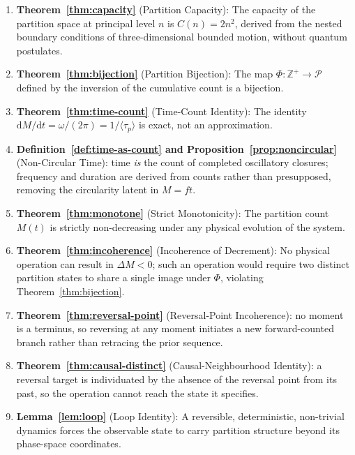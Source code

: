 \documentclass[twocolumn,10pt,a4paper]{article}
\theoremstyle{thmstyle}
\theoremstyle{definition}
\theoremstyle{remark}
\newcommand{\Zp}{\mathbb{Z}^{+}}
\newcommand{\Parts}{\mathcal{P}}
\newcommand{\tp}{\langle\tau_{p}\rangle}
\newcommand{\dM}{\mathrm{d}M}
\newcommand{\dt}{\mathrm{d}t}
\newcommand{\PhiMap}{\varPhi}
\begin{document}
\begin{enumerate}[leftmargin=1.5em,itemsep=0.2em]
\item \textbf{Theorem~\ref{thm:capacity}} (Partition Capacity): The capacity of the partition space at principal level $n$ is $C(n) = 2n^2$, derived from the nested boundary conditions of three-dimensional bounded motion, without quantum postulates.

\item \textbf{Theorem~\ref{thm:bijection}} (Partition Bijection): The map $\PhiMap : \Zp \to \Parts$ defined by the inversion of the cumulative count is a bijection.

\item \textbf{Theorem~\ref{thm:time-count}} (Time-Count Identity): The identity $\dM/\dt = \omega/(2\pi) = 1/\tp$ is exact, not an approximation.

\item \textbf{Definition~\ref{def:time-as-count} and Proposition~\ref{prop:noncircular}} (Non-Circular Time): time \emph{is} the count of completed oscillatory closures; frequency and duration are derived from counts rather than presupposed, removing the circularity latent in $M=ft$.

\item \textbf{Theorem~\ref{thm:monotone}} (Strict Monotonicity): The partition count $M(t)$ is strictly non-decreasing under any physical evolution of the system.

\item \textbf{Theorem~\ref{thm:incoherence}} (Incoherence of Decrement): No physical operation can result in $\Delta M < 0$; such an operation would require two distinct partition states to share a single image under $\PhiMap$, violating Theorem~\ref{thm:bijection}.

\item \textbf{Theorem~\ref{thm:reversal-point}} (Reversal-Point Incoherence): no moment is a terminus, so reversing at any moment initiates a new forward-counted branch rather than retracing the prior sequence.

\item \textbf{Theorem~\ref{thm:causal-distinct}} (Causal-Neighbourhood Identity): a reversal target is individuated by the absence of the reversal point from its past, so the operation cannot reach the state it specifies.

\item \textbf{Lemma~\ref{lem:loop}} (Loop Identity): A reversible, deterministic, non-trivial dynamics forces the observable state to carry partition structure beyond its phase-space coordinates.


\end{enumerate}
\end{document}
